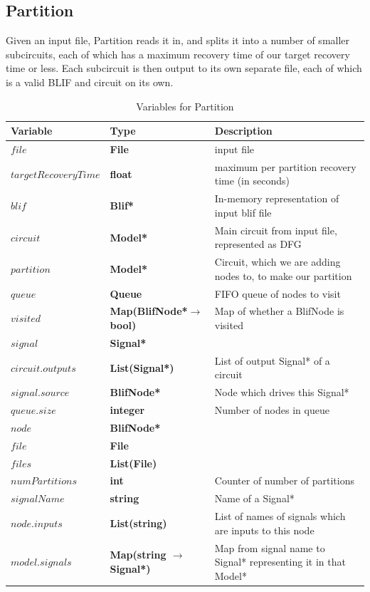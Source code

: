 \documentclass[12pt,final,oneside]{dwThesis} %
\begin{document}
   \subsection{Partition}\label{algPartition}
   Given an input file, Partition reads it in, and splits it into a number of smaller subcircuits, each of which has a maximum recovery time of our target recovery time or less. Each subcircuit is then output to its own separate file, each of which is a valid \ac{BLIF} and circuit on its own.
   \begin{table}
      \begin{center}
         \begin{tabularx}{\linewidth}{llX}
            \toprule
            Variable & Type & Description\\
            \midrule
            $file$ &\textbf{ File  } &  input file\\
            $targetRecoveryTime$ &\textbf{  float } &  maximum per partition recovery time (in seconds)\\
            $blif$ &\textbf{  Blif* } &  In-memory representation of input blif file\\
            $circuit$ &\textbf{   Model* } &  Main circuit from input file, represented as DFG\\
            $partition$ &\textbf{   Model* } &  Circuit, which we are adding nodes to, to make our partition\\
            $queue$ &\textbf{  Queue } &  FIFO queue of nodes to visit\\
            $visited$ &\textbf{   Map(BlifNode*$\to$ bool)} &  Map of whether a BlifNode is visited\\
            $signal$ &\textbf{  Signal* } &  \\
            $circuit.outputs$ &\textbf{  List(Signal*) } &  List of output Signal* of a circuit\\
            $signal.source$ &\textbf{  BlifNode* } &  Node which drives this Signal*\\
            $queue.size$ &\textbf{  integer } &  Number of nodes in queue\\
            $node$ &\textbf{  BlifNode* } &  \\
            $file$ &\textbf{  File } &  \\
            $files$ &\textbf{  List(File) } &  \\
            $numPartitions$ &\textbf{  int } &  Counter of number of partitions\\
            $signalName$ &\textbf{  string } &  Name of a Signal*\\
            $node.inputs$ &\textbf{  List(string) } &  List of names of signals which are inputs to this node\\
            $model.signals$ &\textbf{  Map(string $\to$ Signal*) } &  Map from signal name to Signal* representing it in that Model*\\
            \bottomrule
         \end{tabularx}
         \caption{Variables for Partition}
         \label{varPart}
      \end{center}
   \end{table}
\end{document}
